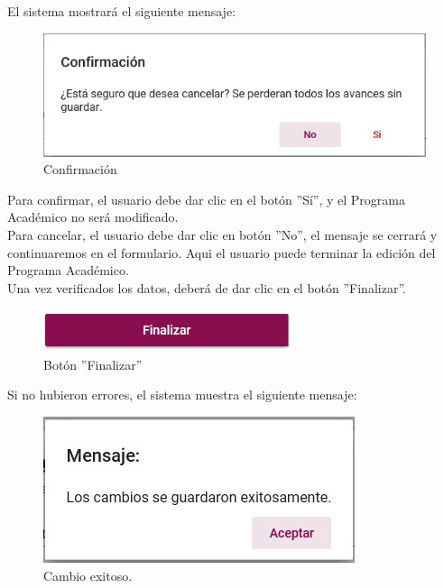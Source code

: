         El sistema mostrará el siguiente mensaje:
        \begin{figure}[!hbtp]
            \centering
            \hypertarget{confirmar}{\includegraphics[width=0.7\linewidth]{images/SP3/Confirmacion}}
            \caption{Confirmación}
            \label{confirmar}
        \end{figure}

        Para confirmar, el usuario debe dar clic en el botón ''Sí'', y el Programa Académico no será modificado.\\

        Para cancelar, el usuario debe dar clic en botón ''No'', el mensaje se cerrará y continuaremos en el formulario. Aqui el usuario puede terminar la edición del Programa Académico.\\

        Una vez verificados los datos, deberá de dar clic en el botón ''Finalizar''.
        \begin{figure}[!hbtp]
        	\centering
        	\hypertarget{btnfin}{\includegraphics[width=0.7\linewidth]{images/SP3/BtnFinalizar}}
        	\caption{Botón ''Finalizar''}
        	\label{btnfin}
        \end{figure}

        Si no hubieron errores, el sistema muestra el siguiente mensaje:

        \begin{figure}[!hbtp]
            \centering
            \hypertarget{cambio}{\includegraphics[width=0.7\linewidth]{images/SP3/Cambio}}
            \caption{Cambio exitoso.}
            \label{cambio}
        \end{figure}

